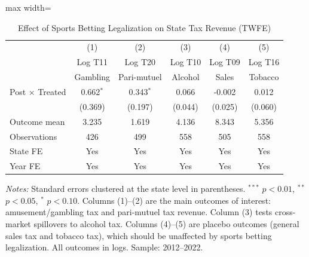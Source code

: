 \begin{table}[htbp]
\centering
\caption{Effect of Sports Betting Legalization on State Tax Revenue (TWFE)}
\label{tab:main}
\begin{adjustbox}{max width=\textwidth}
\begin{tabular}{lccccc}
\hline\hline
 & (1) & (2) & (3) & (4) & (5) \\
 & Log T11 & Log T20 & Log T10 & Log T09 & Log T16 \\
 & Gambling & Pari-mutuel & Alcohol & Sales & Tobacco \\
\hline
Post $\times$ Treated & 0.662$^{*}$ & 0.343$^{*}$ & 0.066 & -0.002 & 0.012 \\
 & (0.369) & (0.197) & (0.044) & (0.025) & (0.060) \\
\hline
Outcome mean & 3.235 & 1.619 & 4.136 & 8.343 & 5.356 \\
Observations & 426 & 499 & 558 & 505 & 558 \\
State FE & Yes & Yes & Yes & Yes & Yes \\
Year FE & Yes & Yes & Yes & Yes & Yes \\
\hline\hline
\end{tabular}
\end{adjustbox}
\begin{minipage}{0.95\textwidth}
\vspace{0.3em}
\footnotesize \textit{Notes:} Standard errors clustered at the state level in parentheses. $^{***}$ $p<0.01$, $^{**}$ $p<0.05$, $^{*}$ $p<0.10$. Columns (1)--(2) are the main outcomes of interest: amusement/gambling tax and pari-mutuel tax revenue. Column (3) tests cross-market spillovers to alcohol tax. Columns (4)--(5) are placebo outcomes (general sales tax and tobacco tax), which should be unaffected by sports betting legalization. All outcomes in logs. Sample: 2012--2022.
\end{minipage}
\end{table}

